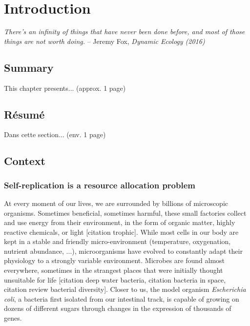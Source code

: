 \chapter{Introduction}

\textit{There's an infinity of things that have never been done before, and most of those things are not worth doing.} -- Jeremy Fox, \textit{Dynamic Ecology (2016)}~\cite{fox_how_2016}

\section*{Summary}

This chapter presents... (approx. 1 page)


\section*{Résumé}

Dans cette section... (env. 1 page)

\section{Context}
\label{sec:context}

\subsection{Self-replication is a resource allocation problem}

At every moment of our lives, we are surrounded by billions of microscopic organisms.
Sometimes beneficial, sometimes harmful, these small factories collect and use energy from their environment, in the form of organic matter, highly reactive chemicals, or light [citation trophic].
While most cells in our body are kept in a stable and friendly micro-environment (temperature, oxygenation, nutrient abundance, ...), microorganisms have evolved to constantly adapt their physiology to a strongly variable environment.
Microbes are found almost everywhere, sometimes in the strangest places that were initially thought unsuitable for life [citation deep water bacteria, citation bacteria in space, citation review bacterial diversity].
Closer to us, the model organism \textit{Escherichia coli}, a bacteria first isolated from our intestinal track, is capable of growing on dozens of different sugars through changes in the expression of thousands of genes\cite{zimmer_microcosm:_2009}.


